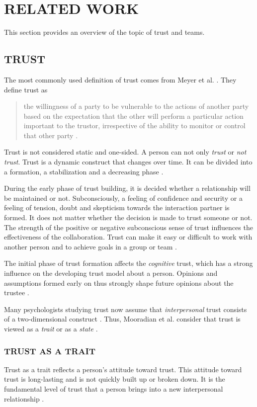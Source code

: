 \documentclass[sigchi]{acmart}
\begin{document}
\section{RELATED WORK}
This section provides an overview of the topic of trust and teams.
\subsection{TRUST}
The most commonly used definition of trust comes from Meyer et al. \citep[p. 712]{mayer1995integrative}. They define trust as
\begin{quote} \grqq{}the willingness of a party to be vulnerable to the actions of another party based on the expectation that the other will perform a particular action important to the trustor, irrespective of the ability to monitor or control that other party\grqq{} \citep[p. 712]{mayer1995integrative}.\end{quote}

Trust is not considered static and one-sided. A person can not only \textit{trust} or \textit{not trust}. Trust is a dynamic construct that changes over time. It can be divided into a formation, a stabilization and a decreasing phase \citep{rousseau1998not}.

During the early phase of trust building, it is decided whether a relationship will be maintained or not. Subconsciously, a feeling of confidence and security or a feeling of tension, doubt and skepticism towards the interaction partner is formed.
It does not matter whether the decision is made to trust someone or not. The strength of the positive or negative subconscious sense of trust influences the effectiveness of the collaboration. Trust can make it easy or difficult to work with another person and to achieve goals in a group or team \citep{bigley1998straining}.

The initial phase of trust formation affects the \textit{cognitive} trust, which has a strong influence on the developing trust model about a person.
Opinions and assumptions formed early on thus strongly shape future opinions about the trustee \citep{baldwin1992relational}.

Many psychologists studying trust now assume that \textit{interpersonal} trust consists of a two-dimensional construct \citep{johnson2005cognitive} \citep{cook1980new}. Thus, Mooradian et al. consider that trust is viewed as a \textit{trait} or as a \textit{state} \citep{mooradian2006trusts}.

\subsubsection{TRUST AS A TRAIT}
Trust as a trait reflects a person's attitude toward trust. This attitude toward trust is long-lasting and is not quickly built up or broken down. It is the fundamental level of trust that a person brings into a new interpersonal relationship \citep{couch1996assessment}. 
\end{document}

